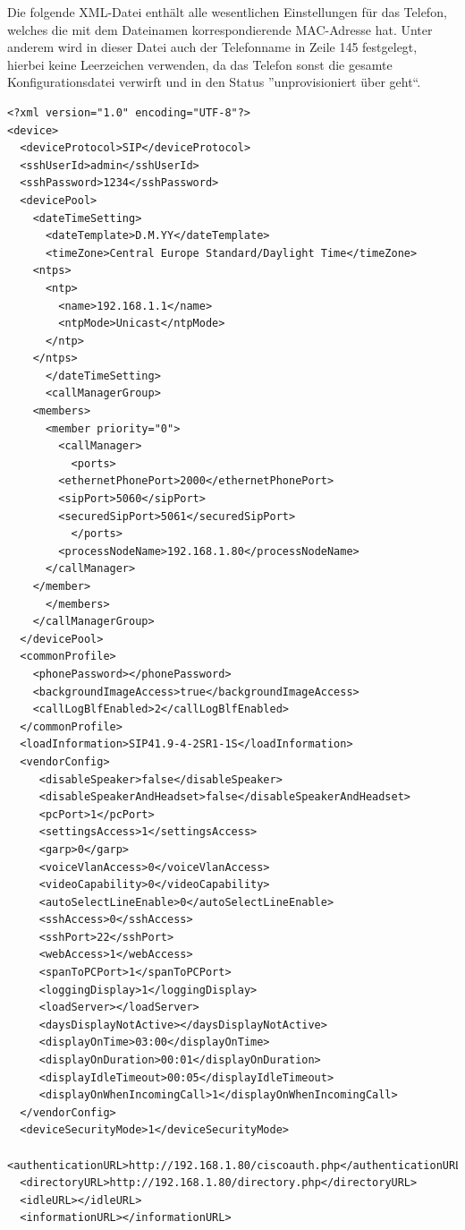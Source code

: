 \documentclass[a4paper,12pt]{scrbook}
\begin{document}
Die folgende XML-Datei enthält alle wesentlichen Einstellungen für das Telefon, welches die mit dem Dateinamen korrespondierende MAC-Adresse hat. Unter anderem wird in dieser Datei
auch der Telefonname in Zeile 145 festgelegt, hierbei keine Leerzeichen verwenden, da das Telefon sonst die gesamte Konfigurationsdatei verwirft und in den Status ''unprovisioniert über geht``.
\begin{lstlisting}[caption={SEP\textbf{0012345678DE}.cnf.xml}, label=lst:cisco7961sep0012345678decnfxml]               
<?xml version="1.0" encoding="UTF-8"?>
<device>
  <deviceProtocol>SIP</deviceProtocol>
  <sshUserId>admin</sshUserId>
  <sshPassword>1234</sshPassword>
  <devicePool>
    <dateTimeSetting>
      <dateTemplate>D.M.YY</dateTemplate>
      <timeZone>Central Europe Standard/Daylight Time</timeZone>
	<ntps>
	  <ntp>
	    <name>192.168.1.1</name>
	    <ntpMode>Unicast</ntpMode>
	  </ntp>
	</ntps>
      </dateTimeSetting>
      <callManagerGroup>
	<members>
	  <member priority="0">
	    <callManager>
	      <ports>
		<ethernetPhonePort>2000</ethernetPhonePort>
		<sipPort>5060</sipPort>
		<securedSipPort>5061</securedSipPort>
	      </ports>
	    <processNodeName>192.168.1.80</processNodeName>
	  </callManager>
	</member>
      </members>
    </callManagerGroup>
  </devicePool>
  <commonProfile>
    <phonePassword></phonePassword>
    <backgroundImageAccess>true</backgroundImageAccess>
    <callLogBlfEnabled>2</callLogBlfEnabled>
  </commonProfile>
  <loadInformation>SIP41.9-4-2SR1-1S</loadInformation>
  <vendorConfig>
     <disableSpeaker>false</disableSpeaker>
     <disableSpeakerAndHeadset>false</disableSpeakerAndHeadset>
     <pcPort>1</pcPort>
     <settingsAccess>1</settingsAccess>
     <garp>0</garp>
     <voiceVlanAccess>0</voiceVlanAccess>
     <videoCapability>0</videoCapability>
     <autoSelectLineEnable>0</autoSelectLineEnable>
     <sshAccess>0</sshAccess>
     <sshPort>22</sshPort>
     <webAccess>1</webAccess>
     <spanToPCPort>1</spanToPCPort>
     <loggingDisplay>1</loggingDisplay>
     <loadServer></loadServer>
     <daysDisplayNotActive></daysDisplayNotActive>
     <displayOnTime>03:00</displayOnTime>
     <displayOnDuration>00:01</displayOnDuration>
     <displayIdleTimeout>00:05</displayIdleTimeout>
     <displayOnWhenIncomingCall>1</displayOnWhenIncomingCall>
  </vendorConfig>
  <deviceSecurityMode>1</deviceSecurityMode>
  <authenticationURL>http://192.168.1.80/ciscoauth.php</authenticationURL>
  <directoryURL>http://192.168.1.80/directory.php</directoryURL>
  <idleURL></idleURL>
  <informationURL></informationURL>

\end{lstlisting}
\end{document}
